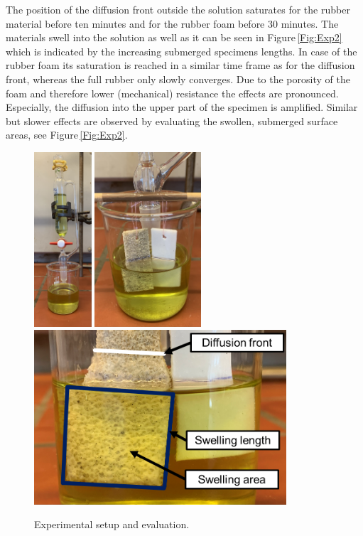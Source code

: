 \documentclass{article}
\begin{document}
The position of the diffusion front outside the solution saturates for the rubber material before ten minutes and for the rubber foam before 30 minutes. The materials swell into the solution as well as it can be seen in Figure\,\ref{Fig:Exp2} which is indicated by the increasing submerged specimens lengths. In case of the rubber foam its saturation is reached in a similar time frame as for the diffusion front, whereas the full rubber only slowly converges. Due to the porosity of the foam and therefore lower (mechanical) resistance the effects are pronounced. Especially, the diffusion into the upper part of the specimen is amplified.  Similar but slower effects are observed by evaluating the swollen, submerged surface areas, see Figure\,\ref{Fig:Exp2}. 

\begin{figure}[h!]
	\centering
	\includegraphics[height=6.5cm]{Exp1.JPEG}
	\hspace{0.1cm}
	\includegraphics[height=6.5cm]{Exp2.JPEG}
	\hspace{0.1cm}
	\includegraphics[height=6.5cm]{Exp3.png}
	\caption{Experimental setup and evaluation.}
	\label{Fig:Exp}
\end{figure}
\end{document}
